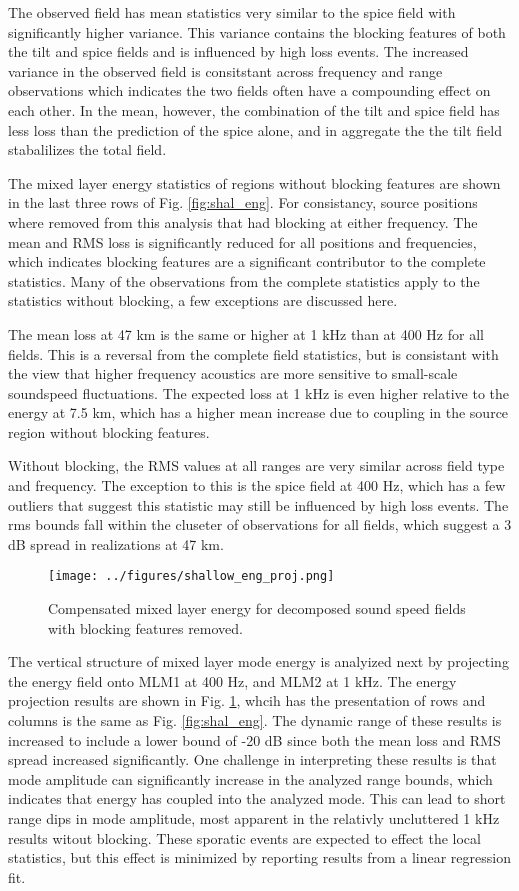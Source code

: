 \documentclass[preprint,NumberedRefs]{JASA}
\begin{document}
The observed field has mean statistics very similar to the spice field with significantly higher variance. This variance contains the blocking features of both the tilt and spice fields and is influenced by high loss events. The increased variance in the observed field is consitstant across frequency and range observations which indicates the two fields often have a compounding effect on each other. In the mean, however, the combination of the tilt and spice field has less loss than the prediction of the spice alone, and in aggregate the the tilt field stabalilizes the total field.

The mixed layer energy statistics of regions without blocking features are shown in the last three rows of Fig. \ref{fig:shal_eng}. For consistancy, source positions where removed from this analysis that had blocking at either frequency. The mean and RMS loss is significantly reduced for all positions and frequencies, which indicates blocking features are a significant contributor to the complete statistics. Many of the observations from the complete statistics apply to the statistics without blocking, a few exceptions are discussed here.

The mean loss at 47 km is the same or higher at 1 kHz than at 400 Hz for all fields. This is a reversal from the complete field statistics, but is consistant with the view that higher frequency acoustics are more sensitive to small-scale soundspeed fluctuations. The expected loss at 1 kHz is even higher relative to the energy at 7.5 km, which has a higher mean increase due to coupling in the source region without blocking features.

Without blocking, the RMS values at all ranges are very similar across field type and frequency. The exception to this is the spice field at 400 Hz, which has a few outliers that suggest this statistic may still be influenced by high loss events. The rms bounds fall within the cluseter of observations for all fields, which suggest a 3 dB spread in realizations at 47 km.

\begin{figure}
\texttt{[image: ../figures/shallow\_eng\_proj.png]}
    \caption{Compensated mixed layer energy for decomposed sound speed fields with blocking features removed.}
    \label{fig:shal_no_block}
\end{figure}
The vertical structure of mixed layer mode energy is analyized next by projecting the energy field onto MLM1 at 400 Hz, and MLM2 at 1 kHz. The energy projection results are shown in Fig. \ref{fig:shal_no_block}, whcih has the presentation of rows and columns is the same as Fig. \ref{fig:shal_eng}. The dynamic range of these results is increased to include a lower bound of -20 dB since both the mean loss and RMS spread increased significantly. One challenge in interpreting these results is that mode amplitude can significantly increase in the analyzed range bounds, which indicates that energy has coupled into the analyzed mode. This can lead to short range dips in mode amplitude, most apparent in the relativly uncluttered 1 kHz results witout blocking. These sporatic events are expected to effect the local statistics, but this effect is minimized by reporting results from a linear regression fit.
\end{document}
